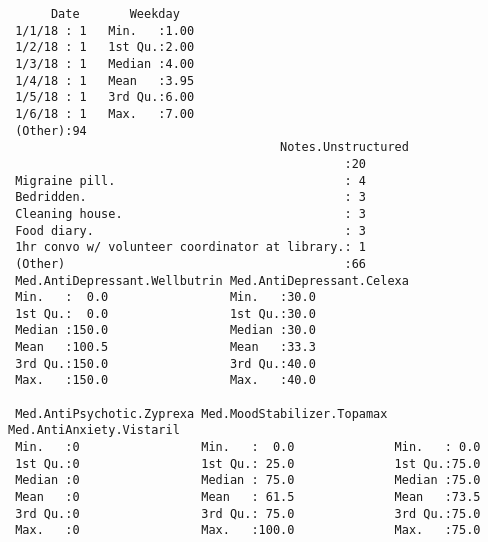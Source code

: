 \documentclass[11pt]{article}
\begin{document}
    
    \begin{verbatim}
      Date       Weekday    
 1/1/18 : 1   Min.   :1.00  
 1/2/18 : 1   1st Qu.:2.00  
 1/3/18 : 1   Median :4.00  
 1/4/18 : 1   Mean   :3.95  
 1/5/18 : 1   3rd Qu.:6.00  
 1/6/18 : 1   Max.   :7.00  
 (Other):94                 
                                      Notes.Unstructured
                                               :20      
 Migraine pill.                                : 4      
 Bedridden.                                    : 3      
 Cleaning house.                               : 3      
 Food diary.                                   : 3      
 1hr convo w/ volunteer coordinator at library.: 1      
 (Other)                                       :66      
 Med.AntiDepressant.Wellbutrin Med.AntiDepressant.Celexa
 Min.   :  0.0                 Min.   :30.0             
 1st Qu.:  0.0                 1st Qu.:30.0             
 Median :150.0                 Median :30.0             
 Mean   :100.5                 Mean   :33.3             
 3rd Qu.:150.0                 3rd Qu.:40.0             
 Max.   :150.0                 Max.   :40.0             
                                                        
 Med.AntiPsychotic.Zyprexa Med.MoodStabilizer.Topamax Med.AntiAnxiety.Vistaril
 Min.   :0                 Min.   :  0.0              Min.   : 0.0            
 1st Qu.:0                 1st Qu.: 25.0              1st Qu.:75.0            
 Median :0                 Median : 75.0              Median :75.0            
 Mean   :0                 Mean   : 61.5              Mean   :73.5            
 3rd Qu.:0                 3rd Qu.: 75.0              3rd Qu.:75.0            
 Max.   :0                 Max.   :100.0              Max.   :75.0            
                                                                              

\end{verbatim}
\end{document}
